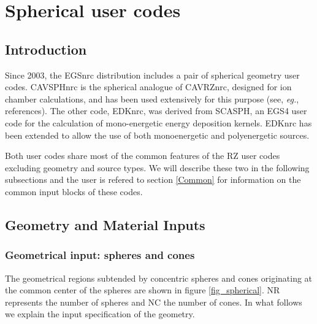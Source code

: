 \documentclass[12pt,twoside]{article}  %
\newcommand{\eg}{{\em eg.}}
\begin{document}
\section{Spherical user codes}

\subsection{Introduction}

Since 2003, the EGSnrc distribution includes a pair of spherical
geometry user codes.
CAVSPHnrc is the spherical analogue of CAVRZnrc, designed for ion chamber
calculations, and has been used extensively for this purpose (see, \eg,
references\cite{Bi90b,RT99}). The other code, EDKnrc, was derived from
SCASPH, an EGS4 user code for the calculation of mono-energetic energy
deposition kernels\cite{Ma88}. EDKnrc has been extended to allow the use
of both monoenergetic and polyenergetic sources.

Both user codes share most of the common features of the RZ user codes
excluding geometry and source types. We will describe these two in the
following subsections and the user is refered to section \ref{Common}
for information on the common input blocks of these codes.

\subsection{Geometry and Material Inputs}

\subsubsection{Geometrical input: spheres and cones}

The geometrical regions subtended by concentric spheres and cones
originating at the common center of the spheres are shown in figure
\ref{fig_spherical}. NR represents the number of spheres and NC the
number of cones. In what follows we explain the input specification of
the geometry.
\end{document}
